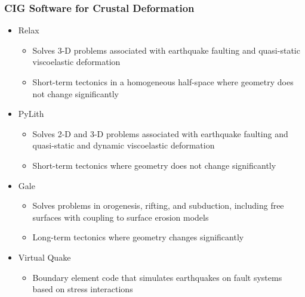 \documentclass{beamer}
\begin{document}
\begin{frame}
  \frametitle{CIG Software for Crustal Deformation}
  \summary{}

  \begin{itemize}
  \item Relax
    \begin{itemize}
    \item Solves 3-D problems associated with earthquake faulting and
      quasi-static viscoelastic deformation
    \item Short-term tectonics in a homogeneous half-space where
      geometry does not change significantly
    \end{itemize}
  \item PyLith
    \begin{itemize}
    \item Solves 2-D and 3-D problems associated with earthquake
      faulting and quasi-static and dynamic viscoelastic deformation
    \item Short-term tectonics where geometry does not change
      significantly
    \end{itemize}
  \item Gale
    \begin{itemize}
    \item Solves problems in orogenesis, rifting, and subduction,
      including free surfaces with coupling to surface erosion models
    \item Long-term tectonics where geometry changes significantly
    \end{itemize}
 
  \item Virtual Quake
    \begin{itemize}
    \item Boundary element code that simulates earthquakes on fault systems based on stress interactions
    \end{itemize}
  \end{itemize}
 
\end{frame}

 
\end{document}

